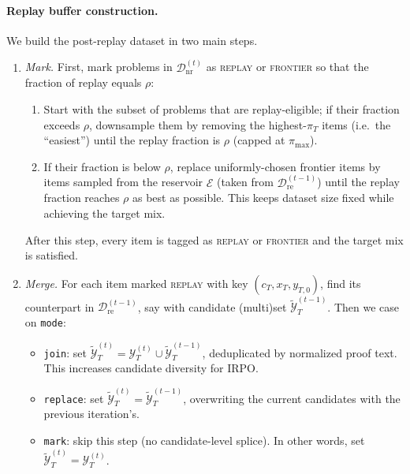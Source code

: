 \paragraph{Replay buffer construction.}
We build the post-replay dataset in two main steps.

\begin{enumerate}
    \item \textit{Mark.} First, mark problems in $\mathcal{D}^{(t)}_{\mathrm{nr}}$ as \textsc{replay} or \textsc{frontier} so that the fraction of replay equals $\rho$:
    \begin{enumerate}
        \item Start with the subset of problems that are replay-eligible; if their fraction exceeds $\rho$, downsample them by removing the highest-$\pi_T$ items (i.e.\ the ``easiest'') until the replay fraction is $\rho$ (capped at $\pi_{\max}$).
        \item If their fraction is below $\rho$, replace uniformly-chosen frontier items by items sampled from the reservoir $\mathcal{E}$ (taken from $\mathcal{D}^{(t-1)}_{\mathrm{re}}$) until the replay fraction reaches $\rho$ as best as possible. This keeps dataset size fixed while achieving the target mix.
    \end{enumerate}
    After this step, every item is tagged as \textsc{replay} or \textsc{frontier} and the target mix is satisfied.

    \item \textit{Merge.} For each item marked \textsc{replay} with key $(c_T,x_T,y_{T,0})$, find its counterpart in $\mathcal{D}^{(t-1)}_{\mathrm{re}}$, say with candidate (multi)set $\mathcal{\widetilde{Y}}^{(t-1)}_T$. Then we case on \texttt{mode}:
    \begin{itemize}
        \item \texttt{join}: set $\mathcal{\widetilde{Y}}^{(t)}_T = \mathcal{Y}^{(t)}_T \cup \mathcal{\widetilde{Y}}^{(t-1)}_T$, deduplicated by normalized proof text. This increases candidate diversity for IRPO.
        \item \texttt{replace}: set $\mathcal{\widetilde{Y}}^{(t)}_T = \mathcal{\widetilde{Y}}^{(t-1)}_T$, overwriting the current candidates with the previous iteration's.
        \item \texttt{mark}: skip this step (no candidate-level splice). In other words, set $\mathcal{\widetilde{Y}}^{(t)}_T = \mathcal{Y}^{(t)}_T$.
    \end{itemize}
\end{enumerate}

